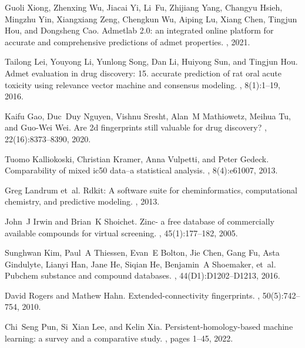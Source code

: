 \documentclass[10pt]{article}
\begin{document}
\begin{thebibliography}{10}
			Guoli Xiong, Zhenxing Wu, Jiacai Yi, Li~Fu, Zhijiang Yang, Changyu Hsieh,
			Mingzhu Yin, Xiangxiang Zeng, Chengkun Wu, Aiping Lu, Xiang Chen, Tingjun
			Hou, and Dongsheng Cao.
			\newblock Admetlab 2.0: an integrated online platform for accurate and
			comprehensive predictions of admet properties.
			, 2021.
			
			Tailong Lei, Youyong Li, Yunlong Song, Dan Li, Huiyong Sun, and Tingjun Hou.
			\newblock Admet evaluation in drug discovery: 15. accurate prediction of rat
			oral acute toxicity using relevance vector machine and consensus modeling.
			, 8(1):1--19, 2016.
			
			Kaifu Gao, Duc~Duy Nguyen, Vishnu Sresht, Alan~M Mathiowetz, Meihua Tu, and
			Guo-Wei Wei.
			\newblock Are 2d fingerprints still valuable for drug discovery?
			, 22(16):8373--8390, 2020.
			
			Tuomo Kalliokoski, Christian Kramer, Anna Vulpetti, and Peter Gedeck.
			\newblock Comparability of mixed ic50 data--a statistical analysis.
			, 8(4):e61007, 2013.
			
			Greg Landrum et~al.
			\newblock Rdkit: A software suite for cheminformatics, computational chemistry,
			and predictive modeling.
			, 2013.
			
			John~J Irwin and Brian~K Shoichet.
			\newblock Zinc- a free database of commercially available compounds for virtual
			screening.
			, 45(1):177--182,
			2005.
			
			Sunghwan Kim, Paul~A Thiessen, Evan~E Bolton, Jie Chen, Gang Fu, Asta
			Gindulyte, Lianyi Han, Jane He, Siqian He, Benjamin~A Shoemaker, et~al.
			\newblock Pubchem substance and compound databases.
			, 44(D1):D1202--D1213, 2016.
			
			David Rogers and Mathew Hahn.
			\newblock Extended-connectivity fingerprints.
			, 50(5):742--754,
			2010.
			
			Chi~Seng Pun, Si~Xian Lee, and Kelin Xia.
			\newblock Persistent-homology-based machine learning: a survey and a
			comparative study.
			, pages 1--45, 2022.
			

\end{thebibliography}
\end{document}

